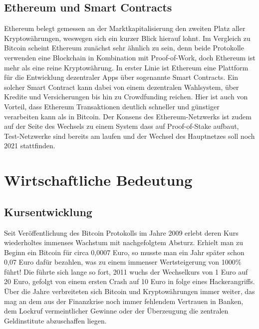 \documentclass[12pt,oneside]{article}
\begin{document}
\subsection{Ethereum und Smart Contracts}

Ethereum belegt gemessen an der Marktkapitalisierung den zweiten Platz aller Kryptowährungen, weswegen sich ein kurzer Blick hierauf lohnt. Im Vergleich zu Bitcoin scheint Ethereum zunächst sehr ähnlich zu sein, denn beide Protokolle verwenden eine Blockchain in Kombination mit Proof-of-Work, doch Ethereum ist mehr als eine reine Kryptowährung. In erster Linie ist Ethereum eine Plattform für die Entwicklung dezentraler Apps über sogenannte Smart Contracts. Ein solcher Smart Contract kann dabei von einem dezentralen Wahlsystem, über Kredite und Versicherungen bis hin zu Crowdfunding reichen. Hier ist auch von Vorteil, dass Ethereum Transaktionen deutlich schneller und günstiger verarbeiten kann als in Bitcoin. Der Konsens des Ethereum-Netzwerks ist zudem auf der Seite des Wechsels zu einem System dass auf Proof-of-Stake aufbaut, Test-Netzwerke sind bereits am laufen und der Wechsel des Hauptnetzes soll noch 2021 stattfinden. \cite{soeteman2019} \cite{eth2021}

\section{Wirtschaftliche Bedeutung}



\subsection{Kursentwicklung}

Seit Veröffentlichung des Bitcoin Protokolls im Jahre 2009 erlebt deren Kurs wiederholtes immenses Wachstum mit nachgefolgtem Absturz. Erhielt man zu Beginn ein Bitcoin für circa 0,0007 Euro, so musste man ein Jahr später schon 0,07 Euro dafür bezahlen, was zu einem immenser Wertsteigerung von 1000\% führt! Die führte sich lange so fort, 2011 wuchs der Wechselkurs von 1 Euro auf 20 Euro, gefolgt von einem ersten Crash auf 10 Euro in folge eines Hackerangriffs. Über die Jahre verbreiteten sich Bitcoin und Kryptowährungen immer weiter, das mag an dem aus der Finanzkrise noch immer fehlendem Vertrauen in Banken, dem Lockruf vermeintlicher Gewinne oder der Überzeugung die zentralen Geldinstitute abzuschaffen liegen. 
\end{document}
